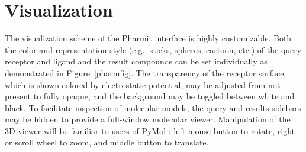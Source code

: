 \section{Visualization}

The visualization scheme of the Pharmit interface is highly customizable.  Both the color and representation style (e.g., sticks, spheres, cartoon, etc.) of the query receptor and ligand and the result compounds can be set individually as demonstrated in Figure~\ref{pharmfig}.  The transparency of the receptor surface, which is shown colored by electrostatic potential, may be adjusted from not present to fully opaque, and the background may be toggled between white and black.  To facilitate inspection of molecular models, the query and results sidebars may be hidden to provide a full-window molecular viewer. Manipulation of the 3D viewer will be familiar to users of PyMol \cite{PyMOL}: left mouse button to rotate, right or scroll wheel to zoom, and middle button to translate.  